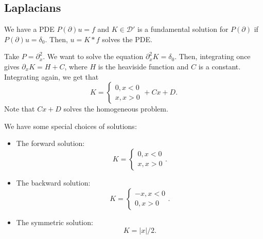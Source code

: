 \documentclass[12pt]{scrartcl}
\begin{document}
\subsection{Laplacians}
We have a PDE $P(\partial) u = f$ and $K \in \mathcal D'$ is a fundamental solution for $P(\partial)$ if $P(\partial)u = \delta_0$.  Then, $u = K * f$ solves the PDE.

\begin{example}[1D Laplacian] Take $P = \partial_x^2$.  We want to solve the equation $\partial_x^2 K = \delta_0$.  Then, integrating once gives $\partial_x K = H + C$, where $H$ is the heaviside function and $C$ is a constant. Integrating again, we get that $$K = \begin{cases}0, x < 0 \\ x, x > 0\end{cases}+Cx + D.$$
Note that $Cx+D$ solves the homogeneous problem.  

We have some special choices of solutions: 
\begin{itemize}
\item The forward solution: $$K = \begin{cases} 0, x < 0 \\ x, x > 0 \end{cases}.$$
\item The backward solution: $$K = \begin{cases} -x, x < 0 \\ 0, x > 0 \end{cases}.$$
\item The symmetric solution: $$K = |x|/2.$$

\end{itemize}
\end{example}
\end{document}
